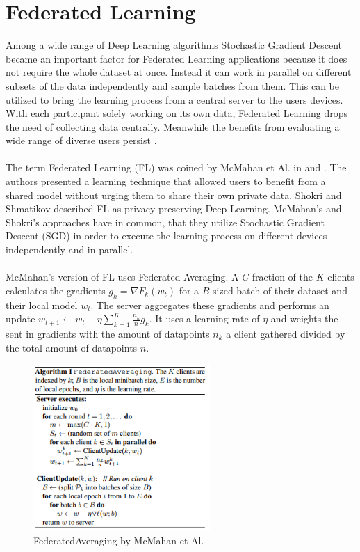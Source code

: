 \documentclass[
	ngerman,
	ruledheaders=section,%
	class=report,%
	thesis={type=bachelor},%
	accentcolor=1b,%
	custommargins=true,%
	marginpar=false,%
	parskip=half-,%
	fontsize=11pt,%
]{tudapub}
\begin{document}
\section{Federated Learning}
Among a wide range of Deep Learning algorithms Stochastic Gradient Descent became an important factor for Federated Learning applications because it does not require the whole dataset at once. Instead it can work in parallel on different subsets of the data independently and sample batches from them. This can be utilized to bring the learning process from a central server to the users devices. With each participant solely working on its own data, Federated Learning drops the need of collecting data centrally. Meanwhile the benefits from evaluating a wide range of diverse users persist \cite{shokri2015privacy}.\\
\\
The term Federated Learning (FL) was coined by McMahan et Al. in \cite{mcmahan2016federated} and \cite{konevcny2016federated}. The authors presented a learning technique that allowed users to benefit from a shared model without urging them to share their own private data. Shokri and Shmatikov \cite{shokri2015privacy} described FL as privacy-preserving Deep Learning. McMahan's and Shokri's approaches have in common, that they utilize Stochastic Gradient Descent (SGD) in order to execute the learning process on different devices independently and in parallel.\\
\\
McMahan's version of FL uses Federated Averaging. A $C$-fraction of the $K$ clients calculates the gradients $g_k = \nabla F_k(w_t)$ for a $B$-sized batch of their dataset and their local model $w_t$. The server aggregates these gradients and performs an update $w_{t+1} \leftarrow w_t - \eta  \sum_{k=1}^K \frac{n_k}{n}g_k$. It uses a learning rate of $\eta$ and weights the sent in gradients with the amount of datapoints $n_k$ a client gathered divided by the total amount of datapoints $n$. 


\begin{figure}[H] 
  \centering
    \includegraphics[width=0.6\textwidth]{Figures/FedAvg.PNG}
  \caption{FederatedAveraging by McMahan et Al. \cite{mcmahan2016federated}}
  \label{fig:fed_avg}
\end{figure}
\end{document}
